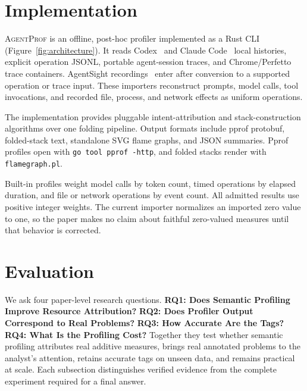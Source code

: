 \documentclass[letterpaper]{article}
\newcommand{\sys}{\textsc{AgentProf}\xspace}
\begin{document}
\section{Implementation}
\label{sec:impl}

\sys is an offline, post-hoc profiler implemented as a Rust CLI
(Figure~\ref{fig:architecture}). It reads Codex~\cite{codexcli} and Claude
Code~\cite{claudecode} local histories, explicit operation JSONL, portable
agent-session traces, and Chrome/Perfetto trace containers. AgentSight
recordings~\cite{agentsight} enter after conversion to a supported operation or
trace input. These importers reconstruct prompts, model calls, tool invocations,
and recorded file, process, and network effects as uniform operations.

The implementation provides pluggable intent-attribution and stack-construction
algorithms over one folding pipeline. Output formats include pprof protobuf,
folded-stack text, standalone SVG flame graphs, and JSON summaries. Pprof
profiles open with \texttt{go tool pprof -http}, and folded stacks render with
\texttt{flamegraph.pl}.

Built-in profiles weight model calls by token count, timed operations by
elapsed duration, and file or network operations by event count.
All admitted results use positive integer weights. The current importer
normalizes an imported zero value to one, so the paper makes no claim about
faithful zero-valued measures until that behavior is corrected.

\section{Evaluation}
\label{sec:eval}

We ask four paper-level research questions. \textbf{RQ1: Does Semantic
Profiling Improve Resource Attribution?} \textbf{RQ2: Does Profiler Output
Correspond to Real Problems?} \textbf{RQ3: How Accurate Are the Tags?}
\textbf{RQ4: What Is the Profiling Cost?} Together they test whether semantic
profiling attributes real additive measures, brings real annotated problems to
the analyst's attention, retains accurate tags on unseen data, and remains
practical at scale. Each subsection distinguishes verified evidence
from the complete experiment required for a final answer.
\end{document}
